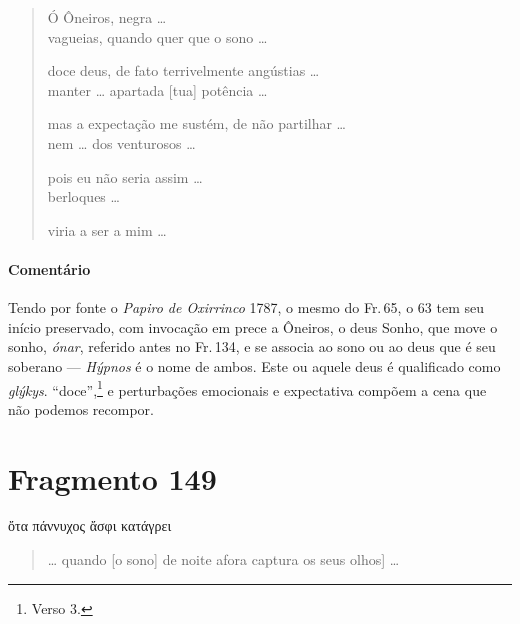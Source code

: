 \begin{verse}
Ó Ôneiros, negra \ldots{}\\
vagueias, quando quer que o sono \ldots{}\\

\medskip

doce deus, de fato terrivelmente angústias \ldots{}\\
manter \ldots{} apartada [tua] potência \ldots{}\\

\medskip

mas a expectação me sustém, de não partilhar \ldots{}\\
nem \ldots{}  dos venturosos \ldots{}\\

\medskip

pois eu não seria assim \ldots{}\\
berloques \ldots{}\\

\medskip

viria a ser a mim \ldots{}
\end{verse}

\medskip

{\paragraph{Comentário} Tendo por fonte o \emph{Papiro de Oxirrinco} 1787, o mesmo do Fr.\,65, o 63 tem seu início preservado, com invocação em prece a Ôneiros, o deus Sonho, que move o sonho, \emph{ónar}, referido antes no Fr.\,134, e se associa ao sono ou ao deus que é seu soberano --- \emph{Hýpnos} é o nome de ambos. Este ou aquele deus é qualificado como \emph{glýkys}. ``doce'',\footnote{Verso 3.} e perturbações emocionais e expectativa compõem a cena que não podemos recompor.}



\section{Fragmento 149}

\begin{gkverse}
ὄτα πάννυχος ἄσφι κατάγρει
\end{gkverse}

\begin{verse}
\ldots{} quando [o sono] de noite afora captura os seus \qb{}{[}olhos{]} \ldots{}
\end{verse}

\medskip

